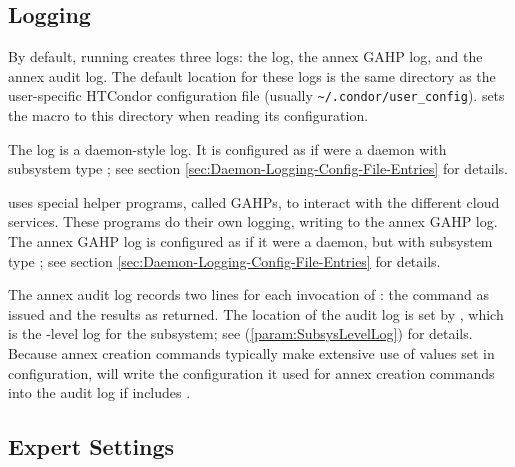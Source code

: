 \subsection{\label{sec:clouds-logging}Logging}

By default, running  creates three logs: the  log,
the annex GAHP log, and the annex audit log.  The default location for these
logs is the same directory as the user-specific HTCondor configuration file
(usually {\tt \textasciitilde/.condor/user\_config}).   sets the
 macro to this directory when reading its configuration.

The  log is a daemon-style log.  It is configured as if
 were a daemon with subsystem type ;
see section \ref{sec:Daemon-Logging-Config-File-Entries} for details.

 uses special helper programs, called GAHPs, to interact
with the different cloud services.  These programs do their own logging,
writing to the annex GAHP log.  The annex GAHP log is configured as if it
were a daemon, but with subsystem type ; see section
\ref{sec:Daemon-Logging-Config-File-Entries} for details.

The annex audit log records two lines for each invocation of :
the command as issued and the results as returned.  The location of the
audit log is set by , which is the
-level log for the  subsystem; see
 (\ref{param:SubsysLevelLog}) for details.
Because annex creation commands typically make extensive use of values set
in configuration,  will write the configuration it used for
annex creation commands into the audit log if  includes
.

\subsection{\label{sec:clouds-config-experts}Expert Settings}


